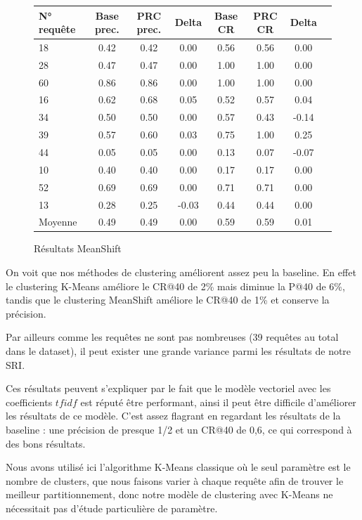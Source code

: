 \documentclass{article}
\begin{document}
\begin{figure}[H]
\begin{tabular}{l*{6}{c}r}
N° requête & Base prec. & PRC prec. & Delta  & Base CR & PRC CR & Delta\\ 
\hline
   18 &    0.42   &   0.42   &   0.00 &  0.56  & 0.56  &   0.00 \\
   28 &    0.47   &   0.47   &   0.00 &  1.00  & 1.00  &   0.00 \\
   60 &    0.86   &   0.86   &   0.00 &  1.00  & 1.00  &   0.00 \\
   16 &    0.62   &   0.68   &   0.05 &  0.52  & 0.57  &   0.04 \\
   34 &    0.50   &   0.50   &   0.00 &  0.57  & 0.43  &  -0.14 \\
   39 &    0.57   &   0.60   &   0.03 &  0.75  & 1.00  &   0.25 \\
   44 &    0.05   &   0.05   &   0.00 &  0.13  & 0.07  &  -0.07 \\
   10 &    0.40   &   0.40   &   0.00 &  0.17  & 0.17  &   0.00 \\
   52 &    0.69   &   0.69   &   0.00 &  0.71  & 0.71  &   0.00 \\
   13 &    0.28   &   0.25   &  -0.03 &  0.44  & 0.44  &   0.00 \\
\hline
Moyenne  &    0.49   &   0.49   &   0.00 &  0.59  & 0.59  &   0.01 \\
\end{tabular}
\caption{Résultats MeanShift}
\end{figure}

On voit que nos méthodes de clustering améliorent assez peu la baseline. En effet le clustering K-Means améliore le CR@40 de 2\% mais diminue la P@40 de 6\%, tandis que le clustering MeanShift améliore le CR@40 de 1\% et conserve la précision. 

Par ailleurs comme les requêtes ne sont pas nombreuses (39 requêtes au total dans le dataset), il peut exister une grande variance parmi les résultats de notre SRI.

Ces résultats peuvent s'expliquer par le fait que le modèle vectoriel avec les coefficients $tfidf$ est réputé être performant, ainsi il peut être difficile d'améliorer les résultats de ce modèle. C'est assez flagrant en regardant les résultats de la baseline : une précision de presque 1/2 et un CR@40 de 0,6, ce qui correspond à des bons résultats.

Nous avons utilisé ici l'algorithme K-Means classique où le seul paramètre est le nombre de clusters, que nous faisons varier à chaque requête afin de trouver le meilleur partitionnement, donc notre modèle de clustering avec K-Means ne nécessitait pas d'étude particulière de paramètre.
\end{document}
